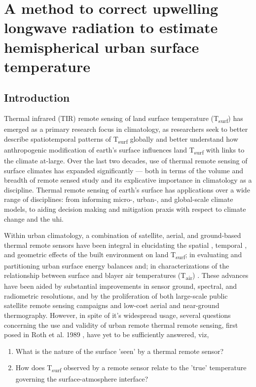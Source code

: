 \chapter{A method to correct upwelling longwave radiation to estimate hemispherical urban surface temperature}

\section{Introduction}
Thermal infrared (TIR) remote sensing of land surface temperature (T\textsubscript{surf}) has emerged as a primary research focus in climatology, as researchers seek to better describe spatiotemporal patterns of T\textsubscript{surf} globally and better understand how anthropogenic modification of earth's surface influences land T\textsubscript{surf} with links to the climate at-large. Over the last two decades, use of thermal remote sensing of surface climates has expanded significantly --- both in terms of the volume and breadth of remote sensed study and its explicative importance in climatology as a discipline. Thermal remote sensing of earth's surface has applications over a wide range of disciplines: from informing micro-, urban-, and global-scale climate models, to aiding decision making and mitigation praxis with respect to climate change and the \gls{uhi}. 

Within urban climatology, a combination of satellite, aerial, and ground-based thermal remote sensors have been integral in elucidating the spatial \cite{Roth1989}, temporal \cite{Peng2012}, and geometric \cite{Voogt1997} effects of the built environment on land T\textsubscript{surf}; in evaluating and partitioning urban surface energy balances \cite{BastiaanssenW.G.M.1998, Yamaguchi2005} and; in characterizations of the relationship between surface and \gls{blayer} air temperatures (T\textsubscript{air}) \cite{Stoll1992}. These advances have been aided by substantial improvements in sensor ground, spectral, and radiometric resolutions, and by the proliferation of both large-scale public satellite remote sensing campaigns and low-cost aerial and near-ground thermography. However, in spite of it's widespread usage, several questions concerning the use and validity of urban remote thermal remote sensing, first posed in Roth et al. 1989 \cite{Roth1989}, have yet to be sufficiently answered, viz,

\begin{enumerate}
	\item What is the nature of the surface 'seen' by a thermal remote sensor?
	\item How does T\textsubscript{surf} observed by a remote sensor relate to the 'true' temperature governing the surface-atmosphere interface?
\end{enumerate}

